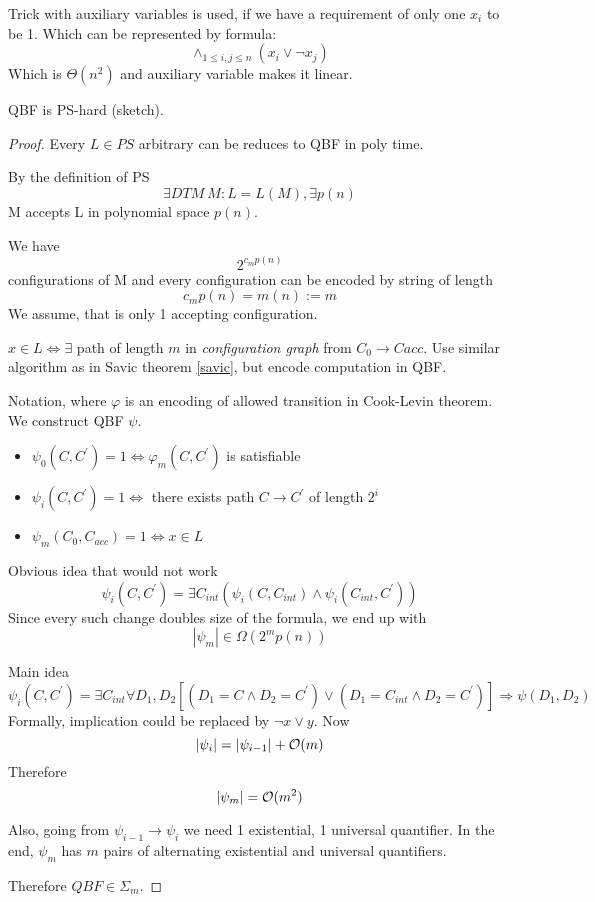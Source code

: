 \begin{note}
	Trick with auxiliary variables is used, if we have a requirement of only one $x_i$ to be 1.
	Which can be represented by formula:
	\[ \wedge_{1 \leq i,j \leq n}(x_i \lor \neg x_j) \]
	Which is $\Theta(n^2)$ and auxiliary variable makes it linear.
\end{note}

\begin{theorem}
	QBF is PS-hard (sketch).
\end{theorem}
\begin{proof}
	Every $L \in PS$ arbitrary can be reduces to QBF in poly time.

	By the definition of PS
	\[ \exists DTM\ M: L = L(M), \exists p(n) \]
	M accepts L in polynomial space $p(n)$.

	We have \[ 2^{c_m p(n)} \] configurations of M and every configuration can be encoded by string of length
	\[ c_m p(n) = m(n) := m \]
	We assume, that is only 1 accepting configuration.

	$x \in L \iff \exists $ path of length $m$ in \emph{configuration graph} from $C_0 \to C{acc}$.
	Use similar algorithm as in Savic theorem \cref{savic}, but encode computation in QBF.

	Notation, where $\varphi$ is an encoding of allowed transition in Cook-Levin theorem.
	We construct QBF $\psi$.
	\begin{itemize}
		\item $ \psi_0(C, C^{\prime}) = 1 \iff \varphi_m(C, C^{\prime})$ is satisfiable
		\item $ \psi_i(C, C^{\prime}) = 1 \iff $ there exists path $C \to C^{\prime}$ of length $2^i$
		\item $ \psi_m(C_0, C_{acc}) = 1 \iff x \in L$
	\end{itemize}

	Obvious idea that would not work
	\[ \psi_i(C, C^{\prime}) = \exists C_{int} (\psi_i(C, C_{int}) \land \psi_i(C_{int}, C^{\prime})) \]
	Since every such change doubles size of the formula, we end up with
	\[ |\psi_m| \in \Omega(2^m p(n)) \]

	Main idea
	\[ \psi_i(C, C^{\prime}) = \exists C_{int} \forall D_1, D_2 [(D_1 = C \land D_2 = C^{\prime}) \lor (D_1 = C_{int} \land D_2 = C^{\prime})] \Rightarrow \psi(D_1, D_2) \]
	Formally, implication could be replaced by $\neg x \lor y$.
	Now
	\[ |\psi_i| = |\psi_{i - 1}| + \mathcal{O}(m) \]
	Therefore
	\[ |\psi_m| = \mathcal{O}(m^2) \]

	Also, going from $\psi_{i - 1} \to \psi_{i}$ we need 1 existential, 1 universal quantifier.
	In the end, $\psi_m$ has $m$ pairs of alternating existential and universal quantifiers.

	Therefore $QBF \in \Sigma_m$.
\end{proof}

